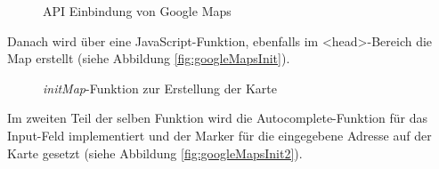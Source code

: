 \begin{figure}[!h]
	\caption{API Einbindung von Google Maps}
	\label{fig:googleMapsAPI}
\end{figure}

Danach wird über eine JavaScript-Funktion, ebenfalls im <head>-Bereich die Map erstellt (siehe Abbildung \vref{fig:googleMapsInit}).

\begin{figure}[!h]
	\caption{\textit{initMap}-Funktion zur Erstellung der Karte}
	\label{fig:googleMapsInit}
\end{figure}

Im zweiten Teil der selben Funktion wird die Autocomplete-Funktion für das Input-Feld implementiert und der Marker für die eingegebene Adresse auf der Karte gesetzt (siehe Abbildung \vref{fig:googleMapsInit2}).

